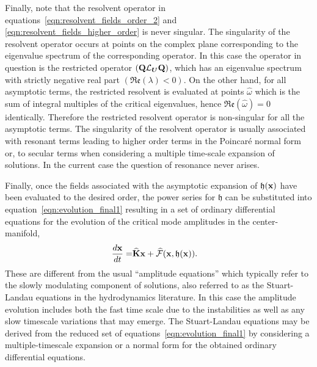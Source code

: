 Finally, note that the resolvent operator in equations~\eqref{eqn:resolvent_fields_order_2} and \eqref{eqn:resolvent_fields_higher_order} is never singular. The singularity of the resolvent operator occurs at points on the complex plane corresponding to the eigenvalue spectrum of the corresponding operator. In this case the operator in question is the restricted operator $(\mathbf{Q}\mathcal{L}_{\boldsymbol{U}}\mathbf{Q})$, which has an eigenvalue spectrum with strictly negative real part $(\mathfrak{Re}(\lambda) < 0)$. On the other hand, for all asymptotic terms, the restricted resolvent is evaluated at points $\widehat{\omega}$ which is the sum of integral multiples of the critical eigenvalues, hence $\mathfrak{Re}(\widehat{\omega}) = 0$ identically. Therefore the restricted resolvent operator is non-singular for all the asymptotic terms. The singularity of the resolvent operator is usually associated with resonant terms leading to higher order terms in the Poincar\'{e} normal form or, to secular terms when considering a multiple time-scale expansion of solutions. In the current case the question of resonance never arises. 

Finally, once the fields associated with the asymptotic expansion of $\mathfrak{h}(\mathbf{x})$ have been evaluated to the desired order, the power series for $\mathfrak{h}$ can be substituted into equation~\eqref{eqn:evolution_final1} resulting in a set of ordinary differential equations for the evolution of the critical mode amplitudes in the center-manifold,
\begin{align}
	\dfrac{d\mathbf{x}}{d t} =& \mathbf{\widehat{K}}\mathbf{x} + \mathcal{\widehat{F}}(\mathbf{x},\mathfrak{h}(\mathbf{x})) \label{eqn:amplitude}.
\end{align}
These are different from the usual ``amplitude equations'' \cite{newell69,cross80,cross09} which typically refer to the slowly modulating component of solutions, also referred to as the Stuart-Landau equations \citep{stuart58,stuart60,sipp07} in the hydrodynamics literature. In this case the amplitude evolution includes both the fast time scale due to the instabilities as well as any slow timescale variations that may emerge. The Stuart-Landau equations may be derived from the reduced set of equations~\eqref{eqn:evolution_final1} by considering a multiple-timescale expansion or a normal form for the obtained ordinary differential equations. 












